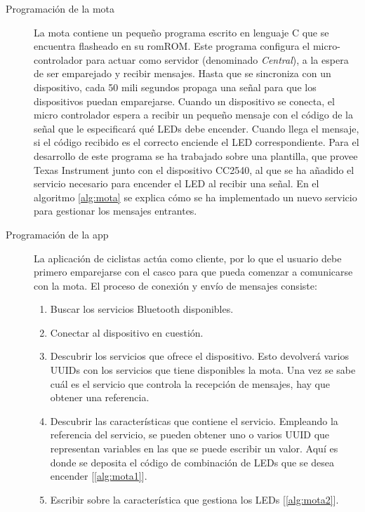 \begin{description}
	\item[Programación de la mota] La mota contiene un pequeño programa escrito en
	lenguaje C que se	encuentra flasheado en su \gls{rom}ROM. Este programa configura
	el micro-controlador para actuar como servidor (denominado \emph{Central}), a
	la espera de ser emparejado y recibir mensajes. Hasta que se sincroniza con un
	dispositivo, cada 50 mili segundos propaga una señal para que los dispositivos
	puedan emparejarse. Cuando un dispositivo se conecta, el micro controlador espera
	a recibir un pequeño mensaje con el código de la señal que le especificará qué
	LEDs debe encender. Cuando llega el mensaje, si el código recibido es el correcto
	enciende el LED correspondiente. Para el desarrollo de este programa se ha trabajado
	sobre una plantilla, que provee Texas Instrument junto con el dispositivo CC2540,
	al que se ha añadido el servicio necesario para encender el LED al recibir una
	señal. En el algoritmo \ref{alg:mota} se explica cómo se ha implementado un nuevo
	servicio para gestionar los mensajes entrantes.

	\item[Programación de la app] La aplicación de ciclistas actúa como cliente, por
	lo que el usuario debe primero emparejarse con el casco para que pueda comenzar
	a comunicarse con la mota. El proceso de conexión y envío	de mensajes consiste:
		\begin{enumerate}
			\item Buscar los servicios Bluetooth disponibles.

			\item Conectar al dispositivo en cuestión.

			\item Descubrir los servicios que ofrece el dispositivo. Esto devolverá varios
			UUIDs con los servicios que tiene disponibles la mota. Una vez se sabe cuál
			es el servicio que controla la recepción de mensajes, hay que obtener	una
			referencia.

			\item Descubrir las características que contiene el servicio. Empleando la
			referencia del servicio, se pueden obtener uno o varios UUID que representan
			variables en las que se puede escribir un valor. Aquí es donde se deposita
			el código de combinación de LEDs que se desea encender [\ref{alg:mota1}].

			\item Escribir sobre la característica que gestiona los LEDs [\ref{alg:mota2}].
		\end{enumerate}


\end{description}

